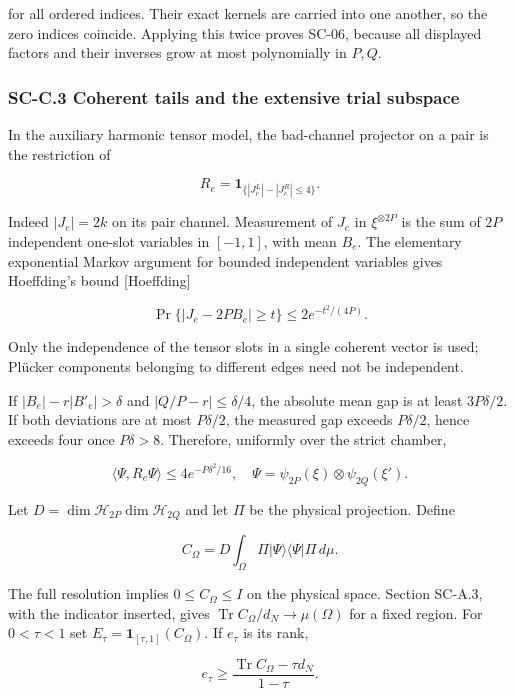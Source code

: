 for all ordered indices. Their exact kernels are carried into one another, so the zero indices coincide. Applying this twice proves SC-06, because all displayed factors and their inverses grow at most polynomially in \(P,Q\).

\hypertarget{sc-c.3-coherent-tails-and-the-extensive-trial-subspace}{%
\subsubsection{SC-C.3 Coherent tails and the extensive trial subspace}\label{sc-c.3-coherent-tails-and-the-extensive-trial-subspace}}

In the auxiliary harmonic tensor model, the bad-channel projector on a pair is the restriction of

\[
R_e=\mathbf1_{\{|J_e^L|-|J_e^R|\leq4\}}.
\]

Indeed \(|J_e|=2k\) on its pair channel. Measurement of \(J_e\) in \(\xi^{\otimes2P}\) is the sum of \(2P\) independent one-slot variables in \([-1,1]\), with mean \(B_e\). The elementary exponential Markov argument for bounded independent variables gives Hoeffding's bound {[}Hoeffding{]}

\[
\Pr\{|J_e-2PB_e|\geq t\}\leq2e^{-t^2/(4P)}.
\]

Only the independence of the tensor slots in a single coherent vector is used; Plücker components belonging to different edges need not be independent.

If \(|B_e|-r|B'_e|>\delta\) and \(|Q/P-r|\leq\delta/4\), the absolute mean gap is at least \(3P\delta/2\). If both deviations are at most \(P\delta/2\), the measured gap exceeds \(P\delta/2\), hence exceeds four once \(P\delta>8\). Therefore, uniformly over the strict chamber,

\[
\langle\Psi,R_e\Psi\rangle\leq4e^{-P\delta^2/16},
\quad\Psi=\psi_{2P}(\xi)\otimes\psi_{2Q}(\xi').
\]

Let \(D=\dim\mathcal H_{2P}\dim\mathcal H_{2Q}\) and let \(\Pi\) be the physical projection. Define

\[
C_\Omega=D\int_\Omega\Pi|\Psi\rangle\langle\Psi|\Pi\,d\mu.
\]

The full resolution implies \(0\leq C_\Omega\leq I\) on the physical space. Section SC-A.3, with the indicator inserted, gives \(\operatorname{Tr}C_\Omega/d_N\to\mu(\Omega)\) for a fixed region. For \(0<\tau<1\) set \(E_\tau=\mathbf1_{[\tau,1]}(C_\Omega)\). If \(e_\tau\) is its rank,

\[
e_\tau\geq\frac{\operatorname{Tr}C_\Omega-\tau d_N}{1-\tau}.
\]

